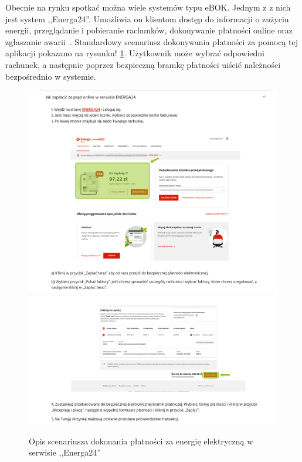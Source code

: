 Obecnie na rynku spotkać można wiele systemów typu eBOK. Jednym z z nich jest system ,,Energa24''. Umożliwia on klientom dostęp do informacji o zużyciu energii, przeglądanie i pobieranie rachunków, dokonywanie płatności online oraz zgłaszanie awarii~\cite{energa}. Standardowy scenariusz dokonywania płatności za pomocą tej aplikacji pokazano na rysunku! \ref{fig:energa_manual}. Użytkownik może wybrać odpowiedni rachunek, a następnie poprzez bezpieczną bramkę płatności uiścić należności bezpośrednio w systemie.
\begin{figure}[htb]
	\centering
		\includegraphics[width=0.85\linewidth]{zrzuty_ekranu/energa_manual_1.png} \\[-1ex]
		\includegraphics[width=0.85\linewidth]{zrzuty_ekranu/energa_manual_2.png} \\[-1ex]
		\caption{Opis scenariusza dokonania płatności za energię elektryczną w serwisie ,,Energa24''~\cite{energa}}
	\label{fig:energa_manual}
\end{figure}



